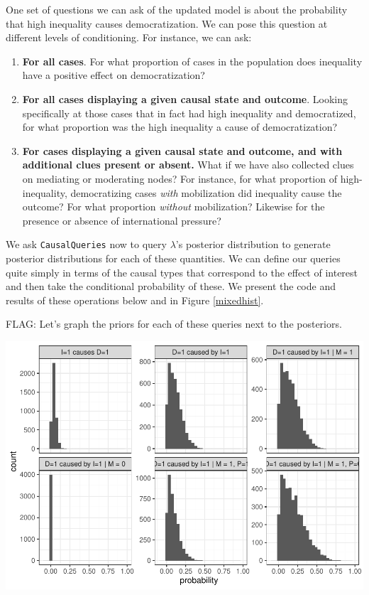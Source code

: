 \documentclass[
  12pt,
]{book}
\begin{document}
One set of questions we can ask of the updated model is about the probability that high inequality causes democratization. We can pose this question at different levels of conditioning. For instance, we can ask:

\begin{enumerate}
\def\labelenumi{\arabic{enumi}.}
\item
  \textbf{For all cases}. For what proportion of cases in the population does inequality have a positive effect on democratization?
\item
  \textbf{For all cases displaying a given causal state and outcome}. Looking specifically at those cases that in fact had high inequality and democratized, for what proportion was the high inequality a cause of democratization?
\item
  \textbf{For cases displaying a given causal state and outcome, and with additional clues present or absent.} What if we have also collected clues on mediating or moderating nodes? For instance, for what proportion of high-inequality, democratizing cases \emph{with} mobilization did inequality cause the outcome? For what proportion \emph{without} mobilization? Likewise for the presence or absence of international pressure?
\end{enumerate}

We ask \texttt{CausalQueries} now to query \(\lambda\)'s posterior distribution to generate posterior distributions for each of these quantities. We can define our queries quite simply in terms of the causal types that correspond to the effect of interest and then take the conditional probability of these. We present the code and results of these operations below and in Figure \ref{mixedhist}.

FLAG: Let's graph the priors for each of these queries next to the posteriors.

\includegraphics{ii_files/figure-latex/mixedhist-1.pdf}
\end{document}
